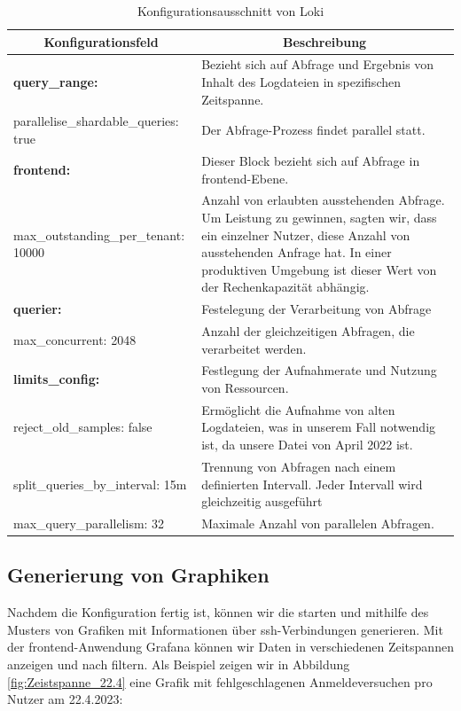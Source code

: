 \begin{table}[H]
  \begin{tabularx}{\textwidth}{|m{6cm}|X|}
  \hline
  \multicolumn{1}{|c|}{\textbf{Konfigurationsfeld}} & \multicolumn{1}{|c|}{\textbf{Beschreibung}} \\
  \hline
  \textbf{query\_range:} & Bezieht sich auf Abfrage und Ergebnis von Inhalt des Logdateien in spezifischen Zeitspanne. \\
  \hphantom{te}parallelise\_shardable\_queries: true & Der Abfrage-Prozess findet parallel statt.\\ \hline

  \textbf{frontend:} & Dieser Block bezieht sich auf Abfrage in \gls{frontend}-Ebene. \\
  \hphantom{te}max\_outstanding\_per\_tenant: 10000 & Anzahl von erlaubten  ausstehenden Abfrage. Um Leistung zu gewinnen, sagten wir, dass ein einzelner Nutzer, diese Anzahl von ausstehenden Anfrage hat. In einer produktiven Umgebung ist dieser Wert von der Rechenkapazität abhängig.\\ \hline

  \textbf{querier:} & Festelegung der Verarbeitung von Abfrage \\ 
  \hphantom{te}max\_concurrent: 2048 & Anzahl der gleichzeitigen Abfragen, die verarbeitet werden. \\ \hline

  \textbf{limits\_config:} & Festlegung der Aufnahmerate und Nutzung von Ressourcen. \\ 
  \hphantom{te}reject\_old\_samples: false & Ermöglicht die Aufnahme von alten Logdateien, was in unserem Fall notwendig ist, da unsere Datei von April 2022 ist. \\ 
  \hphantom{te}split\_queries\_by\_interval: 15m & Trennung von Abfragen nach einem definierten Intervall. Jeder Intervall wird gleichzeitig ausgeführt \\ 
  \hphantom{te}max\_query\_parallelism: 32 & Maximale Anzahl von parallelen Abfragen.  \\ \hline

  \end{tabularx}
  \caption[Konfigurationsausschnitt von Loki]
  {Konfigurationsausschnitt von Loki}
  \label{tab:KonfigLoki}
\end{table}

\subsection{Generierung von Graphiken}
Nachdem die Konfiguration fertig ist, können wir die  starten und mithilfe des Musters von \cite{VoidQuark_sshlogs} Grafiken mit Informationen über \gls{ssh}-Verbindungen generieren. Mit der \gls{frontend}-Anwendung Grafana können wir Daten in verschiedenen Zeitspannen anzeigen und nach  filtern. Als Beispiel zeigen wir in Abbildung \ref{fig:Zeistspanne_22.4} eine Grafik mit fehlgeschlagenen Anmeldeversuchen pro Nutzer am 22.4.2023:

